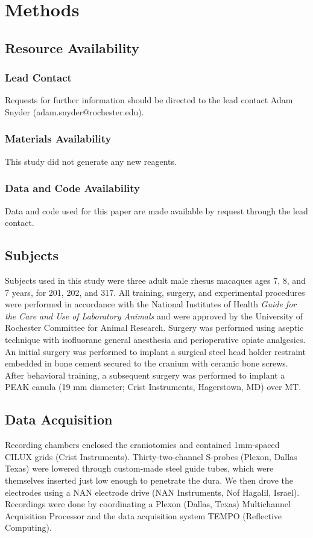\section*{Methods}
\label{sec:methods}

\subsection*{Resource Availability}
\subsubsection*{Lead Contact }
Requests for further information should be directed to the lead contact Adam Snyder (adam.snyder@rochester.edu).

\subsubsection*{Materials Availability }
This study did not generate any new reagents. 

\subsubsection*{Data and Code Availability}
Data and code used for this paper are made available by request through the lead contact.

\subsection*{Subjects} 
Subjects used in this study were three adult male rhesus macaques ages 7, 8, and 7 years, for 201, 202, and 317. All training, surgery, and experimental procedures were performed in accordance with the National Institutes of Health \textit{Guide for the Care and Use of Laboratory Animals} and were approved by the University of Rochester Committee for Animal Research. Surgery was performed using aseptic technique with isofluorane general anesthesia and perioperative opiate analgesics. An initial surgery was performed to implant a surgical steel head holder restraint embedded in bone cement secured to the cranium with ceramic bone screws. After behavioral training, a subsequent surgery was performed to implant a PEAK canula (19 mm diameter; Crist Instruments, Hagerstown, MD) over MT.

\subsection*{Data Acquisition} 
Recording chambers enclosed the craniotomies and contained 1mm-spaced CILUX grids (Crist Instruments). Thirty-two-channel S-probes (Plexon, Dallas Texas) were lowered through custom-made steel guide tubes, which were themselves inserted just low enough to penetrate the dura. We then drove the electrodes using a NAN electrode drive (NAN Instruments, Nof Hagalil, Israel). Recordings were done by coordinating a Plexon (Dallas, Texas) Multichannel Acquisition Processor and the data acquisition system TEMPO (Reflective Computing).

